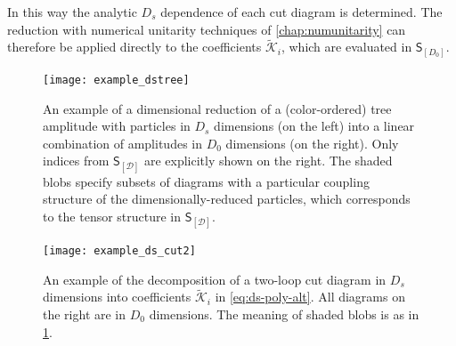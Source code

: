 In this way the analytic $D_s$ dependence of each cut diagram is determined.
The reduction with numerical unitarity techniques of \cref{chap:numunitarity} 
can therefore be applied directly to the coefficients $\tilde{\mathcal{K}}_i$, which are evaluated in $\mathsf{S}_{[D_0]}$.

\begin{figure}[ht]
  \centering
  \texttt{[image: example\_dstree]}
  \caption{An example of a dimensional reduction of a (color-ordered) 
    tree amplitude with particles in $D_s$ dimensions (on the left) into
    a linear combination of amplitudes in $D_0$ dimensions (on the right). 
    Only indices from $\mathsf{S}_{[\mathcal{D}]}$ are explicitly shown on the right.
    The shaded blobs specify subsets of diagrams with a particular coupling structure of the dimensionally-reduced particles, 
    which corresponds to the tensor structure in $\mathsf{S}_{[\mathcal{D}]}$.
  }
  \label{fig:example_dstree}
\end{figure}


\begin{figure}[ht]
  \centering
  \texttt{[image: example\_ds\_cut2]}
  \caption{
    An example of the decomposition of a two-loop cut diagram in $D_s$ dimensions into coefficients $\tilde{\mathcal{K}}_i$ in \cref{eq:ds-poly-alt}.
    All diagrams on the right are in $D_0$ dimensions. The meaning of shaded blobs is as in \cref{fig:example_dstree}.
  }
  \label{fig:example_ds_cut2}
\end{figure}


